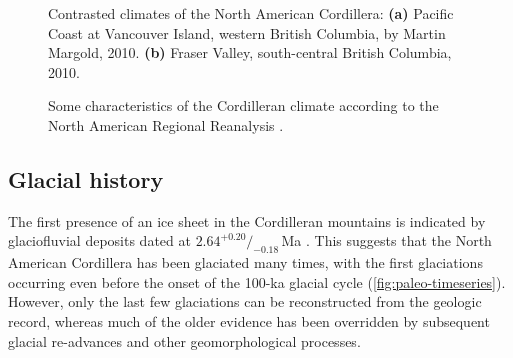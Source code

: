 \documentclass{article}
\newcommand{\subgraphics}[3][,]{%
  \setbox1=\hbox{\texttt{[image: \#3]}}%
  \leavevmode\rlap{\usebox1}%
  \rlap{\hspace*{0.25em}
        \raisebox{\dimexpr\ht1-3ex}{\textbf{(#2)}}}%
  \phantom{\usebox1}%
}
\begin{document}
\begin{figure}
  \centering
  \makebox[0pt]{
    \subgraphics{a}{photo-vancouver-island}
    \hspace{1cm}
    \subgraphics{b}{photo-fraser-valley}
  }
  \caption{Contrasted climates of the North American Cordillera:
           \textbf{(a)} Pacific Coast at Vancouver Island, western British
           Columbia, by Martin Margold, 2010.
           \textbf{(b)} Fraser Valley, south-central British Columbia, 2010.}
  \label{fig:photo-fraser-valley}
\end{figure}

\begin{figure}
  \centering
  \caption{Some characteristics of the Cordilleran climate according to the
           North American Regional Reanalysis
           \citep[NARR,][]{Mesinger.etal.2006}.}
  \label{fig:plot-atm}
\end{figure}


\subsection{Glacial history}

The first presence of an ice sheet in the Cordilleran mountains is indicated by
glaciofluvial deposits dated at $2.64^{+0.20}/_{-0.18}$\,Ma
\citep{Hidy.etal.2013}. This suggests that the North American Cordillera has
been glaciated many times, with the first glaciations occurring even before the
onset of the 100-ka glacial cycle (\cref{fig:paleo-timeseries}). However, only
the last few glaciations can be reconstructed from the geologic record, whereas
much of the older evidence has been overridden by subsequent glacial
re-advances and other geomorphological processes.
\end{document}
